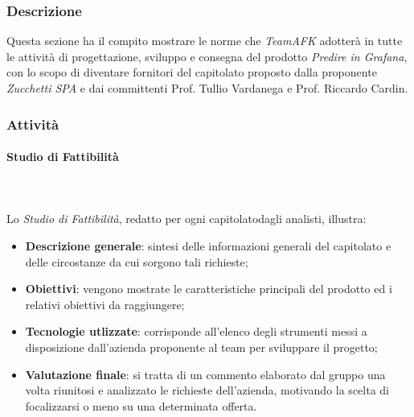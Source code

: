 		\subsubsection{Descrizione}
		Questa sezione ha il compito mostrare le norme che \textit{TeamAFK} adotterà in tutte le attività di progettazione, sviluppo e consegna del prodotto \textit{Predire in Grafana}, con lo scopo di diventare fornitori del capitolato proposto dalla proponente \textit{Zucchetti SPA} e dai committenti Prof. Tullio Vardanega e Prof. Riccardo Cardin.
		\subsubsection{Attività}
			\paragraph{Studio di Fattibilità} \mbox{} \\ \mbox{} \\
			Lo \textit{Studio di Fattibilità}, redatto per ogni capitolato\glo dagli analisti, illustra:
			\begin{itemize}
				\item \textbf{Descrizione generale}: sintesi delle informazioni generali del capitolato e delle circostanze da cui sorgono tali richieste;
				\item \textbf{Obiettivi}: vengono mostrate le caratteristiche principali del prodotto ed i relativi obiettivi da raggiungere;
				\item \textbf{Tecnologie utlizzate}: corrisponde all'elenco degli strumenti messi a disposizione dall'azienda proponente al team per sviluppare il progetto;
				\item \textbf{Valutazione finale}: si tratta di un commento elaborato dal gruppo una volta riunitosi e analizzato le  richieste dell'azienda, motivando la scelta di focalizzarsi o meno su una determinata offerta.
			\end{itemize}

